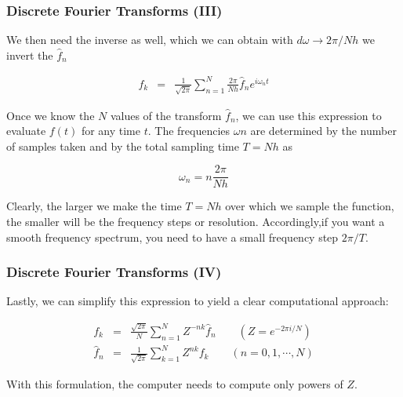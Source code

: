 \documentclass[hyperref={colorlinks=true}]{beamer}
\begin{document}
\begin{frame}%
  \frametitle{Discrete Fourier Transforms (III)}

  We then need the inverse as well, which we can obtain with $d\omega \rightarrow 2\pi/Nh $ we invert the $\hat{f}_n $
      
  \begin{eqnarray}
    f_k &=& \frac{1}{\sqrt{2\pi}} \sum_{n=1}^{N} \frac{2\pi}{Nh}  \hat{f}_n  e^{i\omega_n t}  
  \end{eqnarray}
  
  Once we know the $N$ values of the transform $\hat{f}_n$, we can use this expression to evaluate $f(t)$ for any time $t$. The frequencies $\omega n$ are determined by the number of samples taken and by the total sampling time $T = N h$ as
  
  \begin{equation}
    \omega_n = n\frac{2\pi}{Nh}
  \end{equation}
  
  Clearly, the larger we make the time $T = Nh$ over which we sample the function, the smaller will be the frequency steps or resolution. Accordingly,if you want a smooth frequency spectrum, you need to have a small frequency step $2\pi/T$.
  
\end{frame}


\begin{frame}%
  \frametitle{Discrete Fourier Transforms (IV)}

  Lastly, we can simplify this expression to yield a clear computational approach:
      
  \begin{eqnarray}
    f_k       &=& \frac{\sqrt{2\pi}}{N} \sum_{n=1}^{N} Z^{-nk}\hat{f}_{n} \qquad (Z=e^{-2\pi i/N}) \\
    \hat{f}_n &=& \frac{1}{\sqrt{2\pi}} \sum_{k=1}^{N} Z^{nk} f_k \qquad (n=0,1,\cdots,N) 
  \end{eqnarray}
  
  With this formulation, the computer needs to compute only powers of $Z$.
  
\end{frame}

\end{document}
